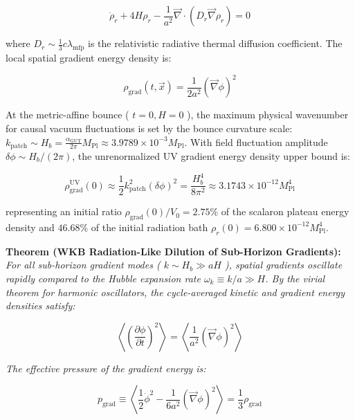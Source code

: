 \documentclass[11pt,a4paper]{article}
\theoremstyle{definition}
\theoremstyle{remark}
\begin{document}
\begin{equation}
\dot{\rho}_r + 4H\rho_r - \frac{1}{a^2}\vec{\nabla} \cdot (D_r \vec{\nabla}\rho_r) = 0
\end{equation}


where $D_r \sim \frac{1}{3} c \lambda_{\text{mfp}}$ is the relativistic radiative thermal diffusion coefficient. The local spatial gradient energy density is:


\begin{equation}
\rho_{\text{grad}}(t, \vec{x}) = \frac{1}{2a^2} (\vec{\nabla}\phi)^2
\end{equation}


At the metric-affine bounce ( $t = 0, H = 0$ ), the maximum physical wavenumber for causal vacuum fluctuations is set by the bounce curvature scale: $k_{\text{patch}} \sim H_b = \frac{\alpha_{\text{GUT}}}{2\pi} M_{\text{Pl}} \approx 3.9789 \times 10^{-3} M_{\text{Pl}}$. With field fluctuation amplitude $\delta\phi \sim H_b / (2\pi)$, the unrenormalized UV gradient energy density upper bound is:


\begin{equation}
\rho_{\text{grad}}^{\text{UV}}(0) \approx \frac{1}{2} k_{\text{patch}}^2 (\delta\phi)^2 = \frac{H_b^4}{8\pi^2} \approx 3.1743 \times 10^{-12} M_{\text{Pl}}^4
\end{equation}


representing an initial ratio $\rho_{\text{grad}}(0) / V_0 = 2.75\%$ of the scalaron plateau energy density and $46.68\%$ of the initial radiation bath $\rho_r(0) = 6.800 \times 10^{-12} M_{\text{Pl}}^4$.

\textbf{Theorem (WKB Radiation-Like Dilution of Sub-Horizon Gradients):}
\textit{For all sub-horizon gradient modes ( $k \sim H_b \gg a H$ ), spatial gradients oscillate rapidly compared to the Hubble expansion rate $\omega_k \equiv k/a \gg H$. By the virial theorem for harmonic oscillators, the cycle-averaged kinetic and gradient energy densities satisfy:}


\begin{equation}
\left\langle \left(\frac{\partial\phi}{\partial t}\right)^2 \right\rangle = \left\langle \frac{1}{a^2} (\vec{\nabla}\phi)^2 \right\rangle
\end{equation}


\textit{The effective pressure of the gradient energy is:}


\begin{equation}
p_{\text{grad}} \equiv \left\langle \frac{1}{2} \dot{\phi}^2 - \frac{1}{6a^2} (\vec{\nabla}\phi)^2 \right\rangle = \frac{1}{3} \rho_{\text{grad}}
\end{equation}
\end{document}
